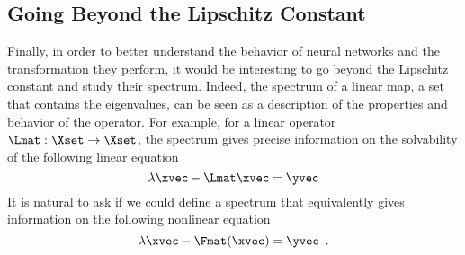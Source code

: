 %
%
%






\subsection{Going Beyond the Lipschitz Constant} 

Finally, in order to better understand the behavior of neural networks and the transformation they perform, it would be interesting to go beyond the Lipschitz constant and study their spectrum.
Indeed, the spectrum of a linear map, a set that contains the eigenvalues, can be seen as a description of the properties and behavior of the operator.
For example, for a linear operator $\Lmat: \Xset \rightarrow \Xset$, the spectrum gives precise information on the solvability of the following linear equation
\begin{equation}
  \lambda \xvec - \Lmat \xvec = \yvec
\end{equation}
It is natural to ask if we could define a spectrum that equivalently gives information on the following nonlinear equation
\begin{equation}
  \lambda \xvec - \Fmat(\xvec) = \yvec \enspace.
\end{equation}

